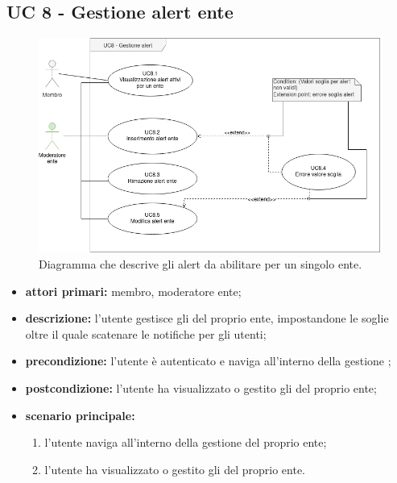	\subsection{UC 8 - Gestione alert ente}

		\begin{figure}[H]
			\centering
			\includegraphics[scale=0.60]{res/images/uc8}
			\caption{Diagramma che descrive gli alert da abilitare per un singolo ente.}
		\end{figure}

		\begin{itemize}
			\item \textbf{attori primari:} membro, moderatore ente;
			\item \textbf{descrizione:} l'utente gestisce gli  del proprio ente, impostandone le soglie oltre il quale scatenare le notifiche per gli utenti;
			\item \textbf{precondizione:} l'utente è autenticato e naviga all'interno della gestione ;
			\item \textbf{postcondizione:} l'utente ha visualizzato o gestito gli  del proprio ente;
			\item \textbf{scenario principale:}
			\begin{enumerate}
				\item{l'utente naviga all'interno della gestione  del proprio ente;}
				\item{l'utente ha visualizzato o gestito gli  del proprio ente.}
			\end{enumerate}
		\end{itemize}

